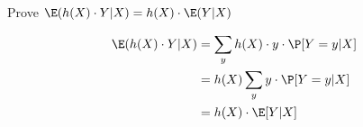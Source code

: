 \question Prove $\E(h(X) \cdot Y|X) = h(X) \cdot \E(Y|X)$
\begin{solution}[.75 cm]
\begin{align*}
\E(h(X) \cdot Y|X) &= \sum_y h(X) \cdot y \cdot \P[Y=y|X] \\
&= h(X) \sum_y y \cdot \P[Y=y|X] \\
&= h(X) \cdot \E[Y|X]
\end{align*}
\end{solution}